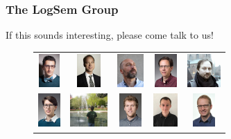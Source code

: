 \documentclass[usenames,dvipsnames,aspectratio=169,12pt]{beamer}
\begin{document}
\begin{frame}
  \frametitle{The LogSem Group}
  If this sounds interesting, please come talk to us!
  \begin{figure}
    \begin{tabular}{ccccc}
    {\includegraphics[height = 0.5in]{aslan.jpg}}      &
    {\includegraphics[height = 0.5in]{lars.jpg}}       &
    {\includegraphics[height = 0.5in]{bas.jpg}}        &
    {\includegraphics[height = 0.5in]{jaco.jpg}}       &
    {\includegraphics[height = 0.5in]{danil.jpg}}     \\
    {\includegraphics[height = 0.5in]{sabine.jpg}}     &
    {\includegraphics[height = 0.5in]{alix.jpg}}       &
    {\includegraphics[height = 0.5in]{kristoffer.jpg}} &
    {\includegraphics[height = 0.5in]{johan.jpg}}      &
    {\includegraphics[height = 0.5in]{martin.jpg}}    \\

\end{tabular}
\end{figure}
\end{frame}
\end{document}
